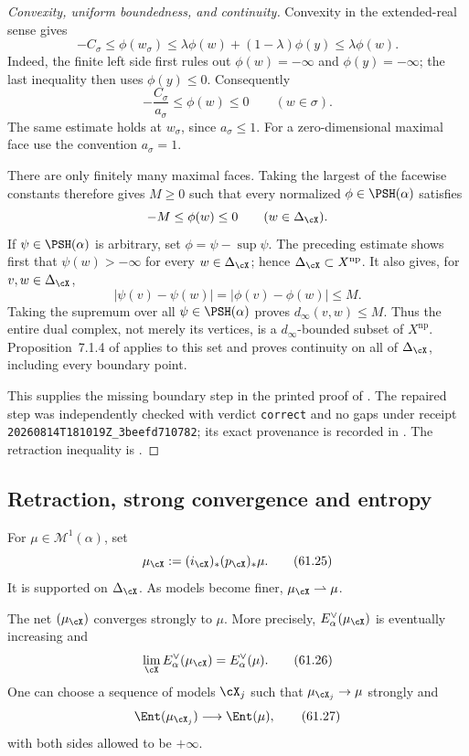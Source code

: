 \begin{proof}[Convexity, uniform boundedness, and continuity]
Convexity in the extended-real sense gives
\[
 -C_\sigma\leq\phi(w_\sigma)
       \leq\lambda\phi(w)+(1-\lambda)\phi(y)
       \leq\lambda\phi(w).
\]
Indeed, the finite left side first rules out \(\phi(w)=-\infty\) and
\(\phi(y)=-\infty\); the last inequality then uses \(\phi(y)\leq0\).
Consequently
\[
             -\frac{C_\sigma}{a_\sigma}\leq\phi(w)\leq0
             \qquad(w\in\sigma).
\]
The same estimate holds at \(w_\sigma\), since \(a_\sigma\leq1\).  For a
zero-dimensional maximal face use the convention \(a_\sigma=1\).

There are only finitely many maximal faces.  Taking the largest of the
facewise constants therefore gives \(M\geq0\) such that every normalized
\(\phi\in\PSH(\alpha)\) satisfies
\[
             -M\leq\phi(w)\leq0
             \qquad(w\in\Delta_\cX).
\]
If \(\psi\in\PSH(\alpha)\) is arbitrary, set
\(\phi=\psi-\sup\psi\).  The preceding estimate shows first that
\(\psi(w)>-\infty\) for every \(w\in\Delta_\cX\); hence
\(\Delta_\cX\subset X^{\mathrm{np}}\).  It also gives, for
\(v,w\in\Delta_\cX\),
\[
             |\psi(v)-\psi(w)|=|\phi(v)-\phi(w)|\leq M.
\]
Taking the supremum over all \(\psi\in\PSH(\alpha)\) proves
\(d_\infty(v,w)\leq M\).  Thus the entire dual complex, not merely its
vertices, is a \(d_\infty\)-bounded subset of \(X^{\mathrm{np}}\).
Proposition~7.1.4 of \cite{MPWN25} applies to this set and proves continuity
on all of \(\Delta_\cX\), including every boundary point.

This supplies the missing boundary step in the printed proof of
\cite[Theorem~7.1.2]{MPWN25}.  The repaired step was independently checked
with verdict \texttt{correct} and no gaps under receipt
\texttt{20260814T181019Z\_3beefd710782}; its exact provenance is recorded in
.  The retraction inequality is
\cite[Lemma~7.1.1]{MPWN25}.
\end{proof}

\subsection{Retraction, strong convergence and entropy}
\label{subsec:mpwn-retracted-measures}

For $\mu\in\mathcal M^1(\alpha)$, set
\[
             \mu_{\cX}:=(i_{\cX})_*(p_{\cX})_*\mu.
\tag{61.25}\label{eq:mpwn-retracted-measure}
\]
It is supported on $\Delta_{\cX}$.  As models become finer,
$\mu_{\cX}\rightharpoonup\mu$.

\begin{theorem}\label{thm:mpwn-measure-approximation}
The net $(\mu_{\cX})$ converges strongly to $\mu$.  More precisely,
$E_\alpha^\vee(\mu_{\cX})$ is eventually increasing and
\[
        \lim_{\cX}E_\alpha^\vee(\mu_{\cX})
              =E_\alpha^\vee(\mu).
\tag{61.26}\label{eq:mpwn-retracted-energy}
\]
One can choose a sequence of models $\cX_j$ such that
$\mu_{\cX_j}\to\mu$ strongly and
\[
              \Ent(\mu_{\cX_j})\longrightarrow\Ent(\mu),
\tag{61.27}\label{eq:mpwn-entropy-approximation}
\]
with both sides allowed to be $+\infty$.
\end{theorem}

